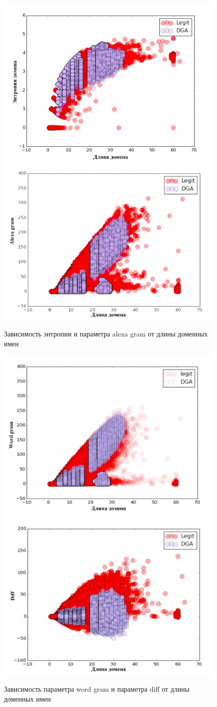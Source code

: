     \begin{figure}[H]
        \left
        \includegraphics[width=0.5\linewidth]{images/linear_class/entropy2.png}
        \right
        \includegraphics[width=0.5\linewidth]{images/linear_class/alexa_gramm.png}
        \caption{Зависимость энтропии и параметра alexa gram от длины доменных имен} \label{entropy_alexa}
    \end{figure}
    \begin{figure}[H]
        \left
        \includegraphics[width=0.5\linewidth]{images/linear_class/word_gramm.png}
        \right
        \includegraphics[width=0.5\linewidth]{images/linear_class/diff.png}
        \caption{Зависимость параметра word gram и параметра diff от длины доменных имен} \label{word_gram_diff}
    \end{figure}
